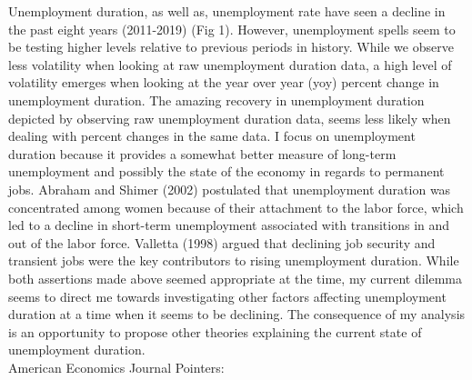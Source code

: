 \documentclass[AEJ]{AEA}
\begin{document}
\maketitle
Unemployment duration, as well as, unemployment rate have seen a decline in the past eight years (2011-2019) (Fig 1). However, unemployment spells seem to be testing higher levels relative to previous periods in history. While we observe less volatility when looking at raw unemployment duration data, a high level of volatility emerges when looking at the year over year (yoy) percent change in unemployment duration. The amazing recovery in unemployment duration depicted by observing raw unemployment duration data,  seems less likely when dealing with percent changes in the same data. I focus on unemployment duration because it provides a somewhat better measure of long-term unemployment and possibly the state of the economy in regards to permanent jobs. Abraham and Shimer (2002) postulated that unemployment duration was concentrated among women because of their attachment to the labor force, which led to a decline in short-term unemployment associated with transitions in and out of the labor force. Valletta (1998) argued that declining job security and transient jobs were the key contributors to rising unemployment duration. While both assertions made above seemed appropriate at the time, my current dilemma seems to direct me towards investigating other factors affecting unemployment duration at a time when it seems to be declining. The consequence of my analysis is an opportunity to propose other theories explaining the current state of unemployment duration.  \\

















American Economics Journal Pointers:
\end{document}
